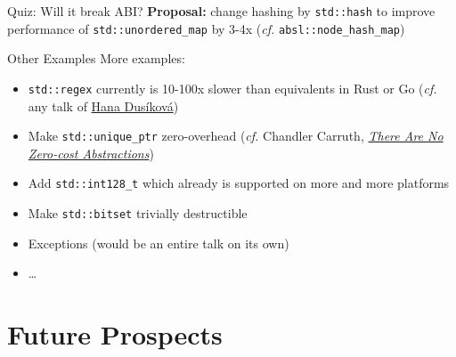 \begin{frame}{Quiz: Will it break ABI?}
    \textbf{Proposal:} change hashing by \texttt{std::hash} to improve performance of \texttt{std::unordered\_map} by 3-4x (\textit{cf.} \texttt{absl::node\_hash\_map})

    \vspace*{5mm}

\end{frame}

\begin{frame}{Other Examples}
    More examples:
    \begin{itemize}
        \item \texttt{std::regex} currently is 10-100x slower than equivalents in Rust or Go (\textit{cf.} any talk of \href{https://youtu.be/8dKWdJzPwHw}{Hana Dusíková})
        \item Make \texttt{std::unique\_ptr} zero-overhead (\textit{cf.} Chandler Carruth, \href{https://youtu.be/rHIkrotSwcc}{\textit{There Are No Zero-cost Abstractions}})
        \item Add \texttt{std::int128\_t} which already is supported on more and more platforms
        \item Make \texttt{std::bitset} trivially destructible
        \item Exceptions (would be an entire talk on its own)
        \item \ldots 
    \end{itemize}

    \centering
\end{frame}

\section{Future Prospects}

